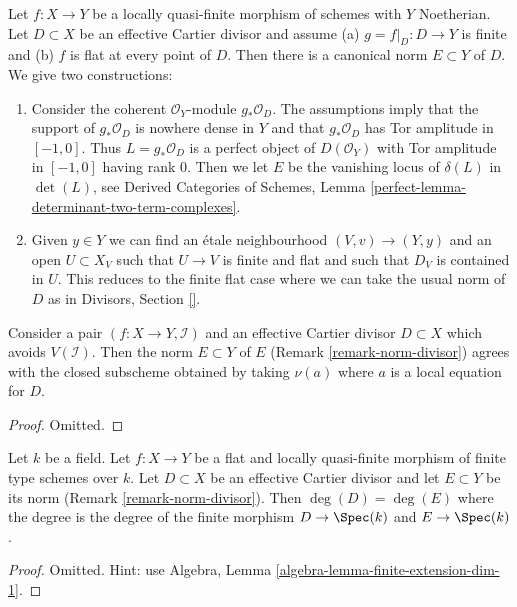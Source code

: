 \begin{remark}
\label{remark-norm-divisor}
Let $f : X \to Y$ be a locally quasi-finite morphism of schemes with
$Y$ Noetherian. Let $D \subset X$ be an effective Cartier divisor and
assume (a) $g = f|_D : D \to Y$ is finite and (b) $f$ is flat at every point
of $D$. Then there is a canonical norm $E \subset Y$ of $D$. We
give two constructions:
\begin{enumerate}
\item Consider the coherent $\mathcal{O}_Y$-module $g_*\mathcal{O}_D$.
The assumptions imply that the support of $g_*\mathcal{O}_D$
is nowhere dense in $Y$ and that $g_*\mathcal{O}_D$
has Tor amplitude in $[-1, 0]$. Thus
$L = g_*\mathcal{O}_D$ is a perfect object of $D(\mathcal{O}_Y)$
with Tor amplitude in $[-1, 0]$ having rank $0$. Then
we let $E$ be the vanishing locus of $\delta(L)$ in $\det(L)$, see
Derived Categories of Schemes, Lemma
\ref{perfect-lemma-determinant-two-term-complexes}.
\item Given $y \in Y$ we can find an \'etale neighbourhood
$(V, v) \to (Y, y)$ and an open $U \subset X_V$ such that
$U \to V$ is finite and flat and such that $D_V$ is contained in $U$.
This reduces to the finite flat case where we can take the usual
norm of $D$ as in Divisors, Section \ref{}.
\end{enumerate}
\end{remark}

\begin{lemma}
\label{lemma-norm-divisor}
Consider a pair $(f : X \to Y, \mathcal{I})$ and an effective
Cartier divisor $D \subset X$ which avoids $V(\mathcal{I})$.
Then the norm $E \subset Y$ of $E$ (Remark \ref{remark-norm-divisor})
agrees with the closed subscheme obtained by taking $\nu(a)$
where $a$ is a local equation for $D$.
\end{lemma}

\begin{proof}
Omitted.
\end{proof}

\begin{lemma}
\label{lemma-degree-norm}
Let $k$ be a field.
Let $f : X \to Y$ be a flat and locally quasi-finite morphism
of finite type schemes over $k$. Let $D \subset X$ be an
effective Cartier divisor and let $E \subset Y$ be its norm
(Remark \ref{remark-norm-divisor}). Then
$\deg(D) = \deg(E)$ where the degree is the degree of
the finite morphism $D \to \Spec(k)$ and $E \to \Spec(k)$.
\end{lemma}

\begin{proof}
Omitted. Hint: use Algebra, Lemma \ref{algebra-lemma-finite-extension-dim-1}.
\end{proof}














